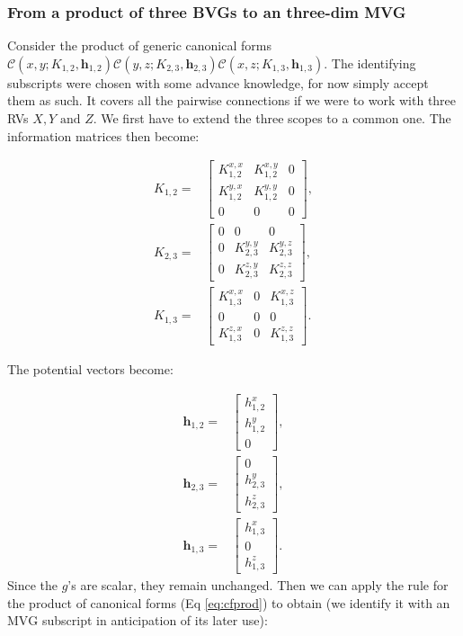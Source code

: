 \subsubsection{From a product of three BVGs to an three-dim MVG}

Consider the product of generic canonical forms $\mathcal{C}(x,y;K_{1,2},\mathbf{h}_{1,2})\mathcal{C}(y,z;K_{2,3},\mathbf{h}_{2,3})\mathcal{C}(x,z;K_{1,3},\mathbf{h}_{1,3})$.
The identifying subscripts were chosen with some advance knowledge,
for now simply accept them as such. It covers all the pairwise connections
if we were to work with three RVs $X,Y\mbox{ and }Z$. We first have
to extend the three scopes to a common one. The information matrices
then become:

\begin{align*}
K_{1,2}= & \left[\begin{array}{ccc}
K_{1,2}^{x,x} & K_{1,2}^{x,y} & 0\\
K_{1,2}^{y,x} & K_{1,2}^{y,y} & 0\\
0 & 0 & 0
\end{array}\right],\\
K_{2,3}= & \left[\begin{array}{ccc}
0 & 0 & 0\\
0 & K_{2,3}^{y,y} & K_{2,3}^{y,z}\\
0 & K_{2,3}^{z,y} & K_{2,3}^{z,z}
\end{array}\right],\\
K_{1,3}= & \left[\begin{array}{ccc}
K_{1,3}^{x,x} & 0 & K_{1,3}^{x,z}\\
0 & 0 & 0\\
K_{1,3}^{z,x} & 0 & K_{1,3}^{z,z}
\end{array}\right].
\end{align*}


The potential vectors become:

\begin{align*}
\mathbf{h}_{1,2}= & \left[\begin{array}{c}
h_{1,2}^{x}\\
h_{1,2}^{y}\\
0
\end{array}\right],\\
\mathbf{h}_{2,3}= & \left[\begin{array}{c}
0\\
h_{2,3}^{y}\\
h_{2,3}^{z}
\end{array}\right],\\
\mathbf{h}_{1,3}= & \left[\begin{array}{c}
h_{1,3}^{x}\\
0\\
h_{1,3}^{z}
\end{array}\right].
\end{align*}
Since the $g$'s are scalar, they remain unchanged. Then we can apply
the rule for the product of canonical forms (Eq \ref{eq:cfprod})
to obtain (we identify it with an $\mbox{MVG}$ subscript in anticipation
of its later use):


